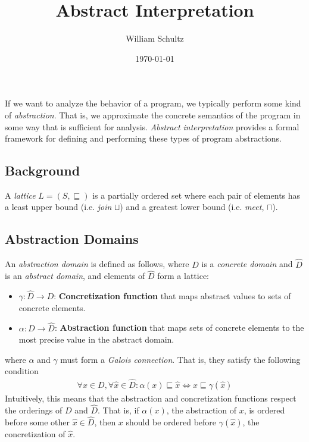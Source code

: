 \documentclass[10pt]{article}
\begin{document}
\title{Abstract Interpretation}
\author{William Schultz}
\date{\today}

\maketitle


If we want to analyze the behavior of a program, we typically perform some kind of \textit{abstraction}. That is, we approximate the concrete semantics of the program in some way that is sufficient for analysis. \textit{Abstract interpretation} provides a formal framework for defining and performing these types of program abstractions.

\subsection*{Background}

A \textit{lattice} $L=(S,\sqsubseteq)$ is a partially ordered set where each pair of elements has a least upper bound (i.e. \textit{join} $\sqcup$) and a greatest lower bound (i.e. \textit{meet}, $\sqcap$).

\subsection*{Abstraction Domains}

An \textit{abstraction domain} is defined as follows, where $D$ is a \textit{concrete domain} and $\hat{D}$ is an \textit{abstract domain}, and elements of $\hat{D}$ form a lattice:
\begin{itemize}
    \item $\gamma : \hat{D} \rightarrow D$: \textbf{Concretization function} that maps abstract values to sets of concrete elements.
    \item $\alpha : D \rightarrow \hat{D}$: \textbf{Abstraction function} that maps sets of concrete elements to the most precise value in the abstract domain. 
\end{itemize}
where $\alpha$ and $\gamma$ must form a \textit{Galois connection}. That is, they satisfy the following condition
\begin{align*}
    \forall x \in D, \forall \hat{x} \in \hat{D} : \alpha(x) \sqsubseteq \hat{x} \Leftrightarrow x \sqsubseteq \gamma(\hat{x}) 
\end{align*} 
Intuitively, this means that the abstraction and concretization functions respect the orderings of $D$ and $\hat{D}$. That is, if $\alpha(x)$, the abstraction of $x$, is ordered before some other $\hat{x} \in \hat{D}$, then $x$ should be ordered before $\gamma(\hat{x})$, the concretization of $\hat{x}$.
\end{document}
